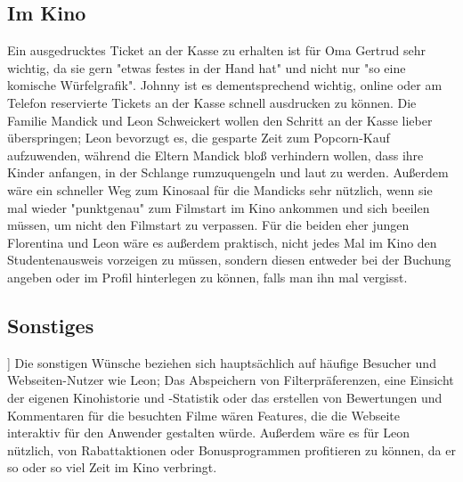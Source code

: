 \subsection{Im Kino}
Ein ausgedrucktes Ticket an der Kasse zu erhalten ist für Oma Gertrud sehr wichtig, da sie gern "etwas festes in der Hand hat" und nicht nur "so eine komische Würfelgrafik". Johnny ist es dementsprechend wichtig, online oder am Telefon reservierte Tickets an der Kasse schnell ausdrucken zu können. Die Familie Mandick und Leon Schweickert wollen den Schritt an der Kasse lieber überspringen; Leon bevorzugt es, die gesparte Zeit zum Popcorn-Kauf aufzuwenden, während die Eltern Mandick bloß verhindern wollen, dass ihre Kinder anfangen, in der Schlange rumzuquengeln und laut zu werden. Außerdem wäre ein schneller Weg zum Kinosaal für die Mandicks sehr nützlich, wenn sie mal wieder "punktgenau" zum Filmstart im Kino ankommen und sich beeilen müssen, um nicht den Filmstart zu verpassen. Für die beiden eher jungen Florentina und Leon wäre es außerdem praktisch, nicht jedes Mal im Kino den Studentenausweis vorzeigen zu müssen, sondern diesen entweder bei der Buchung angeben oder im Profil hinterlegen zu können, falls man ihn mal vergisst.

\subsection{Sonstiges}]
Die sonstigen Wünsche beziehen sich hauptsächlich auf häufige Besucher und Webseiten-Nutzer wie Leon; Das Abspeichern von Filterpräferenzen, eine Einsicht der eigenen Kinohistorie und -Statistik oder das erstellen von Bewertungen und Kommentaren für die besuchten Filme wären Features, die die Webseite interaktiv für den Anwender gestalten würde. Außerdem wäre es für Leon nützlich, von Rabattaktionen oder Bonusprogrammen profitieren zu können, da er so oder so viel Zeit im Kino verbringt.
